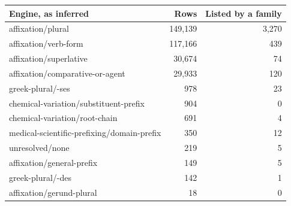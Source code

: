 \begin{tabular}{lrr}
\toprule
Engine, as inferred & Rows & Listed by a family \\
\midrule
affixation/plural & 149,139 & 3,270 \\
affixation/verb-form & 117,166 & 439 \\
affixation/superlative & 30,674 & 74 \\
affixation/comparative-or-agent & 29,933 & 120 \\
greek-plural/-ses & 978 & 23 \\
chemical-variation/substituent-prefix & 904 & 0 \\
chemical-variation/root-chain & 691 & 4 \\
medical-scientific-prefixing/domain-prefix & 350 & 12 \\
unresolved/none & 219 & 5 \\
affixation/general-prefix & 149 & 5 \\
greek-plural/-des & 142 & 1 \\
affixation/gerund-plural & 18 & 0 \\
\bottomrule
\end{tabular}
